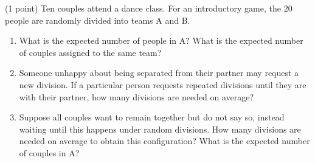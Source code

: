 \documentclass[a4paper]{report}
\begin{document}
\begin{problem} (1 point)
    Ten couples attend a dance class. For an introductory game, the 20 people are randomly divided into teams A and B.

    \begin{enumerate}
        \item What is the expected number of people in A? What is the expected number of couples assigned to the same team?
        \item Someone unhappy about being separated from their partner may request a new division. If a particular person requests
        repeated divisions until they are with their partner, how many divisions are needed on average?
        \item Suppose all couples want to remain together but do not say so, instead waiting
        until this happens under random divisions. How many divisions are needed on average
        to obtain this configuration? What is the expected number of couples in A?
    \end{enumerate}
\end{problem}
\end{document}
